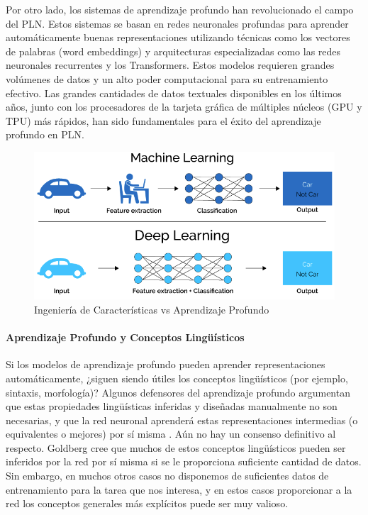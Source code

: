 Por otro lado, los sistemas de aprendizaje profundo han revolucionado el campo del PLN. Estos sistemas se basan en redes neuronales profundas para aprender automáticamente buenas representaciones utilizando técnicas como los vectores de palabras (word embeddings) y arquitecturas especializadas como las redes neuronales recurrentes y los Transformers. Estos modelos requieren grandes volúmenes de datos y un alto poder computacional para su entrenamiento efectivo. Las grandes cantidades de datos textuales disponibles en los últimos años, junto con los procesadores de la tarjeta gráfica de múltiples núcleos (GPU y TPU) más rápidos, han sido fundamentales para el éxito del aprendizaje profundo en PLN.

\begin{figure}[h]
	\centering
	\includegraphics[scale=0.25]{pics/MLvsDL.png}
	\caption{Ingeniería de Características vs Aprendizaje Profundo}
	\label{fig:MLvsDL}
\end{figure}

\paragraph{Aprendizaje Profundo y Conceptos Lingüísticos}
Si los modelos de aprendizaje profundo pueden aprender representaciones automáticamente, ¿siguen siendo útiles los conceptos lingüísticos (por ejemplo, sintaxis, morfología)? Algunos defensores del aprendizaje profundo argumentan que estas propiedades lingüísticas inferidas y diseñadas manualmente no son necesarias, y que la red neuronal aprenderá estas representaciones intermedias (o equivalentes o mejores) por sí misma \cite{goldberg2016primer}. Aún no hay un consenso definitivo al respecto. Goldberg cree que muchos de estos conceptos lingüísticos pueden ser inferidos por la red por sí misma si se le proporciona suficiente cantidad de datos. Sin embargo, en muchos otros casos no disponemos de suficientes datos de entrenamiento para la tarea que nos interesa, y en estos casos proporcionar a la red los conceptos generales más explícitos puede ser muy valioso.


